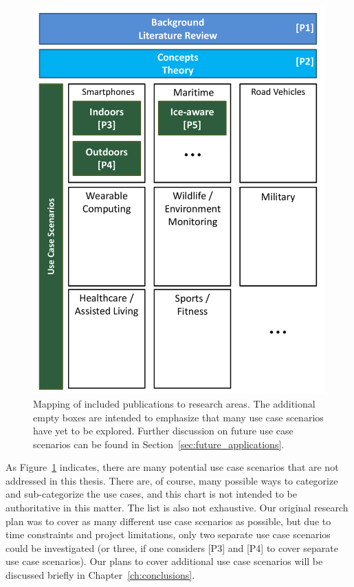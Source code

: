 \begin{figure}
  \begin{center}
    \includegraphics[width=1.0\textwidth]{Images/figChapter4}
  \end{center}
  \caption[Mapping of included publications to research areas]{Mapping of included publications to research areas. The additional empty boxes are intended to emphasize that many use case scenarios have yet to be explored. Further discussion on future use case scenarios can be found in Section~\ref{sec:future_applications}.}
  \label{fig:publication-chart}
\end{figure}

As Figure~\ref{fig:publication-chart} indicates, there are many potential use case scenarios that are not addressed in this thesis. There are, of course, many possible ways to categorize and sub-categorize the use cases, and this chart is not intended to be authoritative in this matter. The list is also not exhaustive. Our original research plan was to cover as many different use case scenarios as possible, but due to time constraints and project limitations, only two separate use case scenarios could be investigated (or three, if one considers [P3] and [P4] to cover separate use case scenarios). Our plans to cover additional use case scenarios will be discussed briefly in Chapter~\ref{ch:conclusions}.


